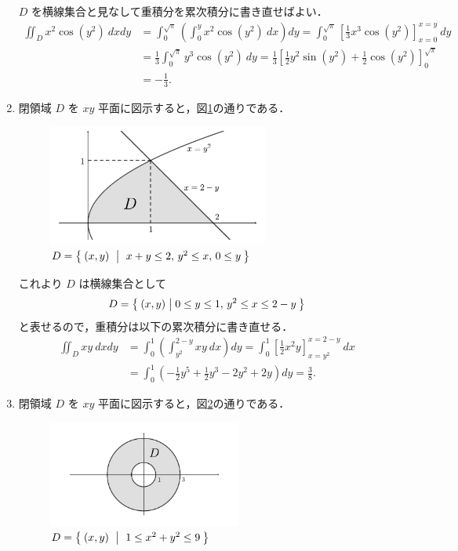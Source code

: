 \documentclass[11pt, uplatex, dvipdfmx]{jsarticle}
\begin{document}
\begin{enumerate}[(1)]
     $D$ を横線集合と見なして重積分を累次積分に書き直せばよい．
     \begin{align*}
       \iint_{D} x^2 \cos (y^2) \ dx dy 
       &= \int_{0}^{\sqrt{\pi}} \left( \int_{0}^{y} x^2 \cos (y^2) \ dx \right)dy
         = \int_{0}^{\sqrt{\pi}} \left[ \frac{1}{3} x^3 \cos(y^2) \right]_{x=0}^{x=y} \ dy\\
       &= \frac{1}{3} \int_{0}^{\sqrt{\pi}} y^3 \cos (y^2) \ dy 
         = \frac{1}{3} \left[\frac{1}{2} y^2 \sin(y^2) + \frac{1}{2}\cos(y^2)\right]_{0}^{\sqrt{\pi}}\\
       &=-\frac{1}{3}.
     \end{align*}


   \item 閉領域 $D$ を $xy$ 平面に図示すると，図\ref{fig:no4}の通りである．
     \begin{figure}[h]
       \centering
       \includegraphics[height=4cm]{./pictures/no4.pdf}
       \caption{$D=\Set{(x,y) \ | \ x+y \leq 2, \, y^2 \leq x, \, 0 \leq y }$} \label{fig:no4}
     \end{figure}
     
     これより $D$ は横線集合として
     \[
       D=\Set{ (x,y)  |  0 \leq y \leq 1, \, y^2 \leq x \leq 2-y }
     \]
     と表せるので，重積分は以下の累次積分に書き直せる．
     \begin{align*}
       \iint_D xy \ dx dy 
       &= \int_{0}^{1} \left( \int_{y^2}^{2-y} xy \ dx \right) dy
         =\int_{0}^{1} \left[ \frac{1}{2}x^2y \right]_{x=y^2}^{x=2-y} \ dx\\
       &=\int_{0}^{1} \left( -\frac{1}{2}y^5 + \frac{1}{2} y^3 - 2y^2 + 2y \right) dy
         =\frac{3}{8}.
     \end{align*}
     
   \item 閉領域 $D$ を $xy$ 平面に図示すると，図\ref{fig:no5}の通りである．
    \begin{figure}[h]
       \centering
       \includegraphics[height=3.5cm]{./pictures/no5.pdf}
       \caption{$D=\Set{ (x,y) \ | \ 1 \leq x^2+y^2 \leq 9}$}\label{fig:no5}        
     \end{figure}


\end{enumerate}
\end{document}

